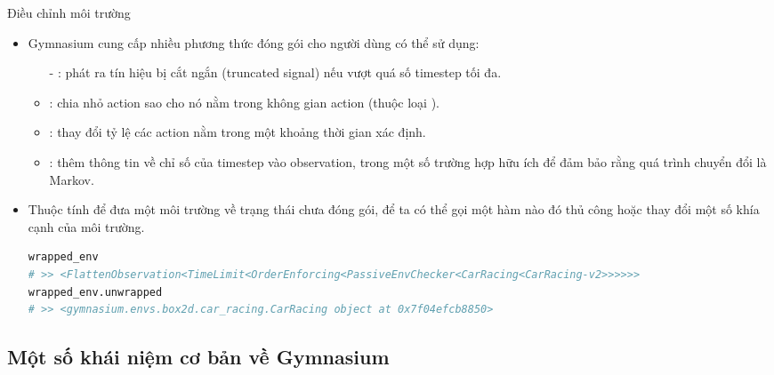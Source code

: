 \documentclass[10pt,aspectratio=169]{beamer}
\begin{document}
\begin{frame}[fragile]{Điều chỉnh môi trường}{\subsecname}
\begin{itemize}
\setlength\itemsep{8pt}
\item Gymnasium cung cấp nhiều phương thức đóng gói cho người dùng có thể sử dụng:\\
\vspace{4pt}
\footnotesize
\begin{itemize}
\setlength\itemsep{4pt}
\item[-] : phát ra tín hiệu bị cắt ngắn (truncated signal) nếu vượt quá số timestep tối đa.
\item[-] : chia nhỏ action sao cho nó nằm trong không gian action (thuộc loại ).
\item[-] : thay đổi tỷ lệ các action nằm trong một khoảng thời gian xác định.
\item[-] : thêm thông tin về chỉ số của timestep vào observation, trong một số trường hợp hữu ích để đảm bảo rằng quá trình chuyển đổi là Markov.
\end{itemize}
\normalsize
\item Thuộc tính  để đưa một môi trường về trạng thái chưa đóng gói, để ta có thể gọi một hàm nào đó thủ công hoặc thay đổi một số khía cạnh của môi trường.\\
\scriptsize
\begin{lstlisting}[language=Python]
wrapped_env
# >> <FlattenObservation<TimeLimit<OrderEnforcing<PassiveEnvChecker<CarRacing<CarRacing-v2>>>>>>
wrapped_env.unwrapped
# >> <gymnasium.envs.box2d.car_racing.CarRacing object at 0x7f04efcb8850>
\end{lstlisting}
\end{itemize}
\end{frame}

\subsection{Một số khái niệm cơ bản về Gymnasium}
\end{document}
